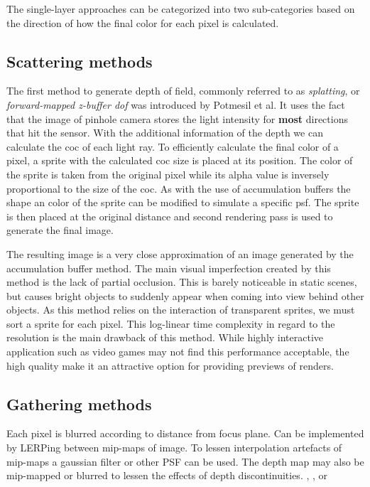 The single-layer approaches can be categorized into two sub-categories based on the direction of how the final color for each pixel is calculated.

\subsection{Scattering methods}
The first method to generate depth of field, commonly referred to as \textit{splatting}, or \textit{forward-mapped z-buffer \gls{dof}} was introduced by Potmesil et al. \cite{Potmesil.1981}
It uses the fact that the image of pinhole camera stores the light intensity for \textbf{most} directions that hit the sensor.
With the additional information of the depth we can calculate the \gls{coc} of each light ray.
To efficiently calculate the final color of a pixel, a sprite with the calculated \gls{coc} size is placed at its position.
The color of the sprite is taken from the original pixel while its alpha value is inversely proportional to the size of the \gls{coc}.
As with the use of accumulation buffers the shape an color of the sprite can be modified to simulate a specific \gls{psf}.
The sprite is then placed at the original distance and second rendering pass is used to generate the final image.

The resulting image is a very close approximation of an image generated by the accumulation buffer method.
The main visual imperfection created by this method is the lack of partial occlusion.
This is barely noticeable in static scenes, but causes bright objects to suddenly appear when coming into view behind other objects.
As this method relies on the interaction of transparent sprites, we must sort a sprite for each pixel.
This log-linear time complexity in regard to the resolution is the main drawback of this method.
While highly interactive application such as video games may not find this performance acceptable, the high quality make it an attractive option for providing previews of renders.\cite{Demers.2005}

\subsection{Gathering methods}
Each pixel is blurred according to distance from focus plane.
Can be implemented by LERPing between mip-maps of image.
To lessen interpolation artefacts of mip-maps a gaussian filter or other PSF can be used.
The depth map may also be mip-mapped or blurred to lessen the effects of depth discontinuities.
\cite{Gilham.2007}, \cite{Hammon.2008},\cite{Zhou.2007} or \cite{Lee.2009}

